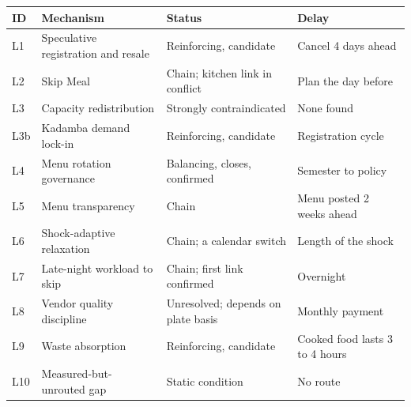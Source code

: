 \documentclass[
  10pt,
  table]{article}
\newcounter{none} %
\begin{document}
{\def\LTcaptype{none} %
\begin{longtable}[]{@{}
  >{\raggedright\arraybackslash}p{}
  >{\raggedright\arraybackslash}p{}
  >{\raggedright\arraybackslash}p{}
  >{\raggedright\arraybackslash}p{}@{}}
\toprule\noalign{}
\begin{minipage}[b]{\linewidth}\raggedright
\cellcolor{pblue}\color{white}\bfseries ID
\end{minipage} & \begin{minipage}[b]{\linewidth}\raggedright
\cellcolor{pblue}\color{white}\bfseries Mechanism
\end{minipage} & \begin{minipage}[b]{\linewidth}\raggedright
\cellcolor{pblue}\color{white}\bfseries Status
\end{minipage} & \begin{minipage}[b]{\linewidth}\raggedright
\cellcolor{pblue}\color{white}\bfseries Delay
\end{minipage} \\
\midrule\noalign{}
\endhead
\bottomrule\noalign{}
\endlastfoot
L1 & Speculative registration and resale & Reinforcing, candidate & Cancel 4 days ahead \\
L2 & Skip Meal & Chain; kitchen link in conflict & Plan the day before \\
L3 & Capacity redistribution & Strongly contraindicated & None found \\
L3b & Kadamba demand lock-in & Reinforcing, candidate & Registration cycle \\
L4 & Menu rotation governance & Balancing, closes, confirmed & Semester to policy \\
L5 & Menu transparency & Chain & Menu posted 2 weeks ahead \\
L6 & Shock-adaptive relaxation & Chain; a calendar switch & Length of the shock \\
L7 & Late-night workload to skip & Chain; first link confirmed & Overnight \\
L8 & Vendor quality discipline & Unresolved; depends on plate basis & Monthly payment \\
L9 & Waste absorption & Reinforcing, candidate & Cooked food lasts 3 to 4 hours \\
L10 & Measured-but-unrouted gap & Static condition & No route \\

\end{longtable}}
\end{document}
